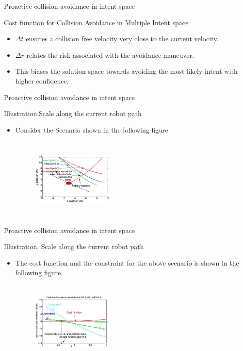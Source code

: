 \documentclass{beamer}
\begin{document}
\begin{frame}{Proactive collision avoidance in intent space}
\begin{block}{Cost function for Collision Avoidance in Multiple Intent space}
\begin{itemize}
\item{$\Delta t$ ensures a collision free velocity very close to the current velocity.}
\item{$\Delta r$ relates the risk associated with the avoidance maneuver.}
\item{This biases the solution space towards avoiding the most likely intent with higher confidence.}
\end{itemize}

\end{block}
\end{frame}
\begin{frame}{Proactive collision avoidance in intent space}
\begin{block}{Illustration,Scale along the current robot path}
\begin{itemize}
\item{Consider the Scenario shown in the following figure}
\begin{figure}
\includegraphics[width= 4.1cm, height=4.1cm]{fig11.eps}
\end{figure}

\end{itemize}

\end{block}
\end{frame}
\begin{frame}{Proactive collision avoidance in intent space}
\begin{block}{Illustration, Scale along the current robot path}
\begin{itemize}
\item{The cost function and the constraint for the above scenario is shown in the following figure.}
\begin{figure}
\includegraphics[width= 4.1cm, height=4.1cm]{fig12.eps}
\end{figure}
\end{itemize}

\end{block}
\end{frame}
\end{document}
